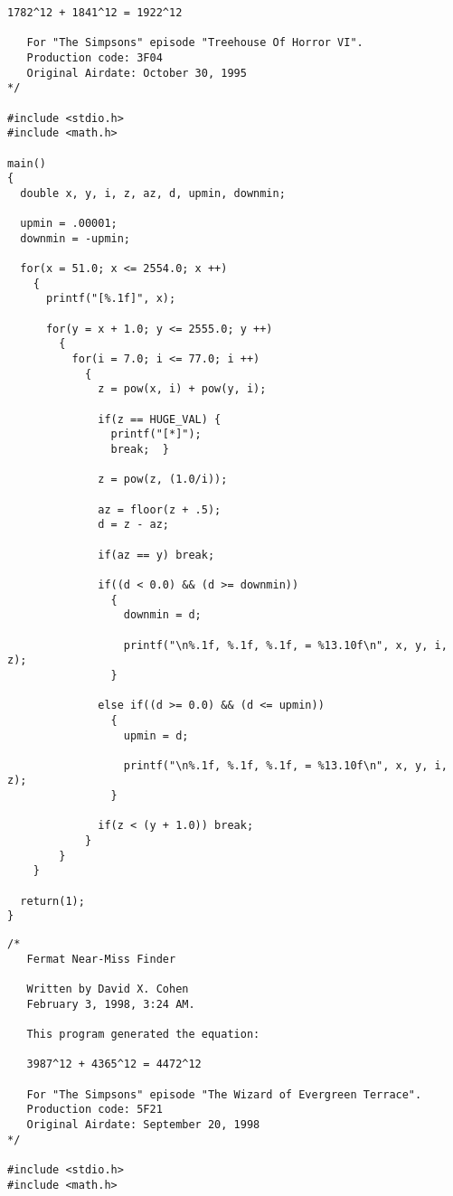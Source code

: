 \begin{appendix}
\begin{lstlisting}[caption={Fermat Near-Miss Finder (Version 1)}, captionpos=b]
   1782^12 + 1841^12 = 1922^12

   For "The Simpsons" episode "Treehouse Of Horror VI".
   Production code: 3F04
   Original Airdate: October 30, 1995
*/

#include <stdio.h>
#include <math.h>

main()
{
  double x, y, i, z, az, d, upmin, downmin;

  upmin = .00001;
  downmin = -upmin;

  for(x = 51.0; x <= 2554.0; x ++)
    {
      printf("[%.1f]", x);

      for(y = x + 1.0; y <= 2555.0; y ++)
        {
          for(i = 7.0; i <= 77.0; i ++)
            {
              z = pow(x, i) + pow(y, i);

              if(z == HUGE_VAL) {
                printf("[*]");
                break;  }

              z = pow(z, (1.0/i));

              az = floor(z + .5);
              d = z - az;

              if(az == y) break;

              if((d < 0.0) && (d >= downmin))
                {
                  downmin = d;

                  printf("\n%.1f, %.1f, %.1f, = %13.10f\n", x, y, i, z);
                }

              else if((d >= 0.0) && (d <= upmin))
                {
                  upmin = d;

                  printf("\n%.1f, %.1f, %.1f, = %13.10f\n", x, y, i, z);
                }

              if(z < (y + 1.0)) break;
            }
        }
    }

  return(1);
}
\end{lstlisting}

\begin{lstlisting}[caption={Fermat Near-Miss Finder (Version 2)}, captionpos=b]
/*
   Fermat Near-Miss Finder

   Written by David X. Cohen
   February 3, 1998, 3:24 AM.
   
   This program generated the equation:

   3987^12 + 4365^12 = 4472^12

   For "The Simpsons" episode "The Wizard of Evergreen Terrace".
   Production code: 5F21
   Original Airdate: September 20, 1998
*/

#include <stdio.h>
#include <math.h>



\end{lstlisting}
\end{appendix}
